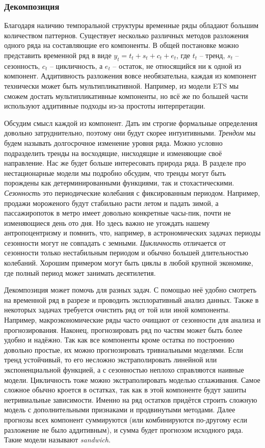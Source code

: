\documentclass[12pt,fleqn]{article}
\begin{document}
\subsubsection{Декомпозиция}

Благодаря наличию темпоральной структуры временные ряды обладают большим количеством паттернов. Существует несколько различных методов разложения одного ряда на составляющие его компоненты. В общей постановке можно представить временной ряд в виде $y_t = t_t + s_t + c_t + e_t$, где $t_t$ -- тренд, $s_t$ -- сезонность,  $c_t$ -- цикличность, а $e_t$ -- остаток, не относящийся ни к одной из компонент. Аддитивность разложения вовсе необязательна, каждая из компонент технически может быть мультипликативной. Например, из модели ETS мы сможем достать мультипликативные компоненты, но всё же по большей части используют аддитивные подходы из-за простоты интерпретации.

 Обсудим смысл каждой из компонент. Дать им строгие формальные определения довольно затруднительно, поэтому они будут скорее интуитивными. \emph{Трендом} мы будем называть долгосрочное изменение уровня ряда. Можно условно подразделить тренды на восходящие, нисходящие и изменяющие своё направление. Нас же будет больше интересовать природа ряда. В разделе про нестационарные модели мы подробно обсудим, что тренды могут быть порождены как детерминированными функциями, так и стохастическими. \emph{Сезонность} это периодические колебания с фиксированным периодом. Например, продажи мороженого будут стабильно расти летом и падать зимой, а пассажиропоток в метро имеет довольно конкретные часы-пик, почти не изменяющиеся день ото дня. Но здесь важно не угождать нашему антропоцентризму и помнить, что, например, в астрономических задачах периоды сезонности могут не совпадать с земными. \emph{Цикличность} отличается от сезонности только нестабильным периодом и обычно большей длительностью колебаний. Хорошим примером могут быть циклы в любой крупной экономике, где полный период может занимать десятилетия.
 
 Декомпозиция может помочь для разных задач. С помощью неё удобно смотреть на временной ряд в разрезе и проводить эксплоративный анализ данных. Также в некоторых задачах требуется очистить ряд от той или иной компоненты. Например, макроэкономические ряды часто очищают от сезонности для анализа и прогнозирования. Наконец, прогнозировать ряд по частям может быть более удобно и надёжно. Так как все компоненты кроме остатка по построению довольно простые, их можно прогнозировать тривиальными моделями. Если тренд устойчивый, то его несложно экстраполировать линейной или экспоненциальной функцией, а с сезонностью неплохо справляются наивные модели. Цикличность тоже можно экстраполировать моделью сглаживания. Самое сложное обычно кроется в остатках, так как в этой компоненте будут зашиты нетривиальные зависимости. Именно на ряд остатков придётся строить сложную модель с дополнительными признаками и продвинутыми методами. Далее прогнозы всех компонент суммируются (или комбинируются по-другому если разложение не было аддитивным), и сумма будет прогнозом исходного ряда. Такие модели называют \emph{sandwich}.
\end{document}
